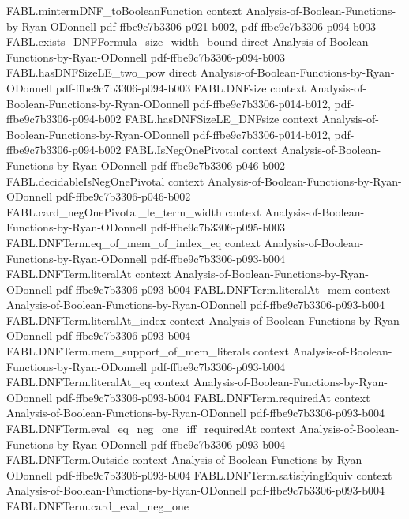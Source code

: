 \begin{theorem}
\proofstep
  {FABL.mintermDNF_toBooleanFunction}
  {context}
  {Analysis-of-Boolean-Functions-by-Ryan-ODonnell}
  {pdf-ffbe9c7b3306-p021-b002,
    pdf-ffbe9c7b3306-p094-b003}
\proofstep
  {FABL.exists_DNFFormula_size_width_bound}
  {direct}
  {Analysis-of-Boolean-Functions-by-Ryan-ODonnell}
  {pdf-ffbe9c7b3306-p094-b003}
\proofstep
  {FABL.hasDNFSizeLE_two_pow}
  {direct}
  {Analysis-of-Boolean-Functions-by-Ryan-ODonnell}
  {pdf-ffbe9c7b3306-p094-b003}
\proofstep
  {FABL.DNFsize}
  {context}
  {Analysis-of-Boolean-Functions-by-Ryan-ODonnell}
  {pdf-ffbe9c7b3306-p014-b012,
    pdf-ffbe9c7b3306-p094-b002}
\proofstep
  {FABL.hasDNFSizeLE_DNFsize}
  {context}
  {Analysis-of-Boolean-Functions-by-Ryan-ODonnell}
  {pdf-ffbe9c7b3306-p014-b012,
    pdf-ffbe9c7b3306-p094-b002}
\proofstep
  {FABL.IsNegOnePivotal}
  {context}
  {Analysis-of-Boolean-Functions-by-Ryan-ODonnell}
  {pdf-ffbe9c7b3306-p046-b002}
\proofstep
  {FABL.decidableIsNegOnePivotal}
  {context}
  {Analysis-of-Boolean-Functions-by-Ryan-ODonnell}
  {pdf-ffbe9c7b3306-p046-b002}
\proofstep
  {FABL.card_negOnePivotal_le_term_width}
  {context}
  {Analysis-of-Boolean-Functions-by-Ryan-ODonnell}
  {pdf-ffbe9c7b3306-p095-b003}
\proofstep
  {FABL.DNFTerm.eq_of_mem_of_index_eq}
  {context}
  {Analysis-of-Boolean-Functions-by-Ryan-ODonnell}
  {pdf-ffbe9c7b3306-p093-b004}
\proofstep
  {FABL.DNFTerm.literalAt}
  {context}
  {Analysis-of-Boolean-Functions-by-Ryan-ODonnell}
  {pdf-ffbe9c7b3306-p093-b004}
\proofstep
  {FABL.DNFTerm.literalAt_mem}
  {context}
  {Analysis-of-Boolean-Functions-by-Ryan-ODonnell}
  {pdf-ffbe9c7b3306-p093-b004}
\proofstep
  {FABL.DNFTerm.literalAt_index}
  {context}
  {Analysis-of-Boolean-Functions-by-Ryan-ODonnell}
  {pdf-ffbe9c7b3306-p093-b004}
\proofstep
  {FABL.DNFTerm.mem_support_of_mem_literals}
  {context}
  {Analysis-of-Boolean-Functions-by-Ryan-ODonnell}
  {pdf-ffbe9c7b3306-p093-b004}
\proofstep
  {FABL.DNFTerm.literalAt_eq}
  {context}
  {Analysis-of-Boolean-Functions-by-Ryan-ODonnell}
  {pdf-ffbe9c7b3306-p093-b004}
\proofstep
  {FABL.DNFTerm.requiredAt}
  {context}
  {Analysis-of-Boolean-Functions-by-Ryan-ODonnell}
  {pdf-ffbe9c7b3306-p093-b004}
\proofstep
  {FABL.DNFTerm.eval_eq_neg_one_iff_requiredAt}
  {context}
  {Analysis-of-Boolean-Functions-by-Ryan-ODonnell}
  {pdf-ffbe9c7b3306-p093-b004}
\proofstep
  {FABL.DNFTerm.Outside}
  {context}
  {Analysis-of-Boolean-Functions-by-Ryan-ODonnell}
  {pdf-ffbe9c7b3306-p093-b004}
\proofstep
  {FABL.DNFTerm.satisfyingEquiv}
  {context}
  {Analysis-of-Boolean-Functions-by-Ryan-ODonnell}
  {pdf-ffbe9c7b3306-p093-b004}
\proofstep
  {FABL.DNFTerm.card_eval_neg_one}

\end{theorem}
